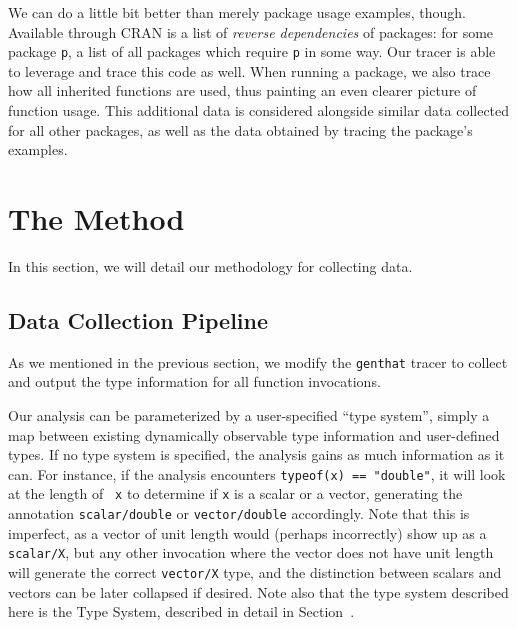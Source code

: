 \documentclass[acmsmall,10pt,review,anonymous]{acmart}\settopmatter{printfolios=true,printccs=false,printacmref=false}
\begin{document}
We can do a little bit better than merely package usage examples, though.
Available through CRAN is a list of {\it reverse dependencies} of packages:
for some package {\tt p}, a list of all packages which require {\tt p} in
some way.  Our tracer is able to leverage and trace this code as well.  When
running a package, we also trace how all inherited functions are used, thus
painting an even clearer picture of function usage.  This additional data is
considered alongside similar data collected for all other packages, as well
as the data obtained by tracing the package's examples.



\section{The Method}

In this section, we will detail our methodology for collecting data.

%
\subsection{Data Collection Pipeline}

As we mentioned in the previous section, we modify the {\tt genthat} tracer
to collect and output the type information for all function invocations.

 Our analysis can be parameterized by a user-specified ``type
system'', simply a map between existing dynamically observable type
information and user-defined types.  If no type system is specified, the
analysis gains as much information as it can.  For instance, if the analysis
encounters {\tt typeof(x) == "double"}, it will look at the length of {\tt
  x} to determine if {\tt x} is a scalar or a vector, generating the
annotation {\tt scalar/double} or {\tt vector/double} accordingly.  Note
that this is imperfect, as a vector of unit length would (perhaps
incorrectly) show up as a {\tt scalar/X}, but any other invocation where the
vector does not have unit length will generate the correct {\tt vector/X}
type, and the distinction between scalars and vectors can be later collapsed
if desired.  Note also that the type system described here is the
 Type System, described in detail in Section~.
\end{document}
